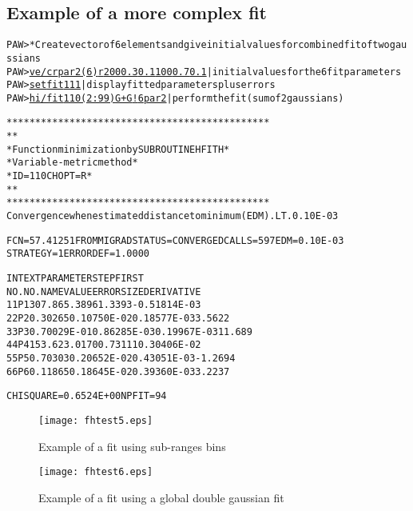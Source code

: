 \subsection*{Example of a more complex fit}
\begin{alltt}
PAW > * Create vector of 6 elements and give initial values for combined fit of two gaussians
PAW > \underline{ve/cr par2(6) r 200 0.3 0.1 100 0.7 0.1}  | initial values for the 6 fit parameters
PAW > \underline{set fit 111}                              | display fitted parameters plus errors
PAW > \underline{hi/fit  110(2:99) G+G  ! 6 par2}          | perform the fit (sum of 2 gaussians)
 
**********************************************
*                                            *
* Function minimization by SUBROUTINE HFITH  *
* Variable-metric method                     *
* ID =        110  CHOPT = R                 *
*                                            *
**********************************************
Convergence when estimated distance to minimum (EDM) .LT.  0.10E-03
 
FCN=   57.41251     FROM MIGRAD    STATUS=CONVERGED  CALLS=  597 EDM=  0.10E-03
                    STRATEGY= 1    ERROR DEF=    1.0000
 
INT EXT  PARAMETER                                   STEP         FIRST
NO. NO.    NAME        VALUE          ERROR          SIZE      DERIVATIVE
  1  1  P1            307.86        5.3896        1.3393      -0.51814E-03
  2  2  P2           0.30265       0.10750E-02   0.18577E-03    3.5622
  3  3  P3           0.70029E-01   0.86285E-03   0.19967E-03    11.689
  4  4  P4            153.62        3.0170       0.73111       0.30406E-02
  5  5  P5           0.70303       0.20652E-02   0.43051E-03   -1.2694
  6  6  P6           0.11865       0.18645E-02   0.39360E-03    3.2237
 
CHISQUARE = 0.6524E+00  NPFIT =   94
\end{alltt}

\begin{sidewaysfigure}
\begin{minipage}{.49\textheight}
\centering\texttt{[image: fhtest5.eps]}
\caption{Example of a fit using sub-ranges bins}
\label{fig:FHTEST5}
\end{minipage}\hfill
\begin{minipage}{.49\textheight}
\centering\texttt{[image: fhtest6.eps]}
\caption{Example of a fit using a global double gaussian fit}
\label{fig:FHTEST6}
\end{minipage}
\end{sidewaysfigure}

